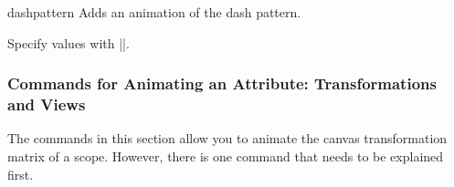 \begin{sysanimateattribute}{dashpattern}
  Adds an animation of the dash pattern.
  
  Specify values with |\pgfsys@animation@val@dashpattern|.
\begin{codeexample}[width=2cm]
\end{codeexample}
\end{sysanimateattribute}


\subsubsection{Commands for Animating an Attribute: Transformations  and Views}

The commands in this section allow you to animate the canvas
transformation matrix of a scope. However, there is one command that
needs to be explained first.

